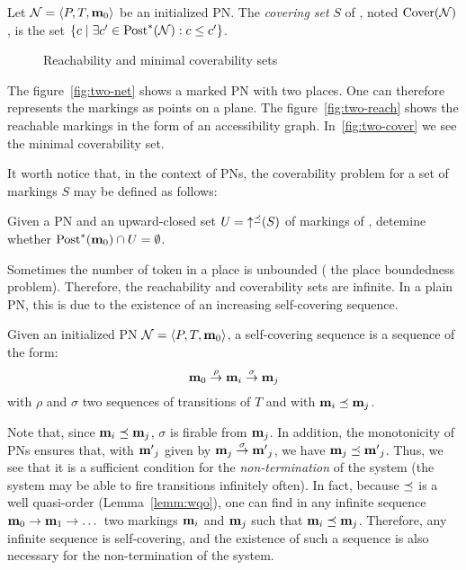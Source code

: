 \begin{defi}
  Let $\mathcal{N} = \langle P,T, \mathbf{m}_0\rangle$ be an initialized \ac{PN}. The \emph{covering set} $S$ of \tupleN, noted $\operatorname{Cover}(\mathcal{N})$, is the set $\{c \mid \exists c' \in \operatorname{Post}^*(\mathcal{N}) : c \leq c' \}$.
\end{defi}

\begin{figure}[htbp]
  \label{fig:reach-and-cover-example}
  \centering
  \subfloat[A \ac{PN} ($|P| = 2$)]{
    \label{fig:two-net}
    

  }

  \qquad
  \caption{Reachability and minimal coverability sets}
\end{figure}

The figure~\ref{fig:two-net} shows a marked \ac{PN} with two places.
One can therefore represents the markings as points on a plane.
The figure~\ref{fig:two-reach} shows the reachable markings in the form of an accessibility graph.
In~\ref{fig:two-cover} we see the minimal coverability set.

It worth notice that, in the context of \acp{PN}, the coverability problem for a set of markings $S$ may be defined as follows:
\begin{defi}
  \label{defi:upclocovprblm}
  Given a \ac{PN} \tupleN and an upward-closed set $U = \operatorname{\uparrow^\preceq}(S)$ of markings of \tupleN, detemine whether $\operatorname{Post}^*(\mathbf{m}_0) \cap U = \emptyset$.
\end{defi}

Sometimes the number of token in a place is unbounded ( the place boundedness problem).
Therefore, the reachability and coverability sets are infinite.
In a plain \ac{PN}, this is due to the existence of an increasing self-covering sequence.
\begin{defi}
  Given an initialized \ac{PN} $\mathcal{N} = \langle P,T, \mathbf{m}_0\rangle$,
  a self-covering sequence is a sequence of the form:
  \[
    \mathbf{m}_0 \stackrel{\rho}{\to} \mathbf{m}_i \stackrel{\sigma}{\to} \mathbf{m}_j
  \]
  with $\rho$ and $\sigma$ two sequences of transitions of $T$
  and with $\mathbf{m}_i \preceq \mathbf{m}_j$.
\end{defi}

Note that, since $\mathbf{m}_i \preceq \mathbf{m}_j$, $\sigma$ is firable from $\mathbf{m}_j$.
In addition, the monotonicity of \acp{PN} ensures that, with $\mathbf{m'}_j$ given by $\mathbf{m}_j \stackrel{\sigma}{\to} \mathbf{m'}_j$, we have $\mathbf{m}_j \preceq \mathbf{m'}_j$.
Thus, we see that it is a sufficient condition for the \emph{non-termination} of the system (the system may be able to fire transitions infinitely often).
In fact, because $\preceq$ is a well quasi-order (Lemma~\ref{lemm:wqo}), one can find in any infinite sequence $\mathbf{m}_0 \stackrel{}{\to} \mathbf{m}_1 \stackrel{}{\to} \dots$ two markings $\mathbf{m}_i$ and $\mathbf{m}_j$ such that $\mathbf{m}_i \preceq \mathbf{m}_j$.
Therefore, any infinite sequence is self-covering, and the existence of such a sequence is also necessary for the non-termination of the system.


